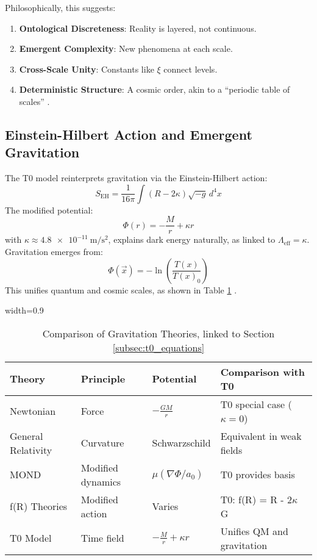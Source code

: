 \documentclass[12pt,a4paper]{article}
\newcommand{\Tfield}{T(x)}
\newcommand{\tablescale}{0.9}
\begin{document}
	Philosophically, this suggests:
	\begin{enumerate}
		\item \textbf{Ontological Discreteness}: Reality is layered, not continuous.
		\item \textbf{Emergent Complexity}: New phenomena at each scale.
		\item \textbf{Cross-Scale Unity}: Constants like \(\xi\) connect levels.
		\item \textbf{Deterministic Structure}: A cosmic order, akin to a “periodic table of scales” \cite{pascher_perspective_2025}.
	\end{enumerate}
	
	\subsection{Einstein-Hilbert Action and Emergent Gravitation}
	\label{sec:gravitation}
	
	The T0 model reinterprets gravitation via the Einstein-Hilbert action:
	\[
	S_{\text{EH}} = \frac{1}{16 \pi} \int (R - 2 \kappa) \sqrt{-g} \, d^4x
	\]
	The modified potential:
	\[
	\Phi(r) = -\frac{M}{r} + \kappa r
	\]
	with \(\kappa \approx \SI{4.8e-11}{\meter\per\second\squared}\), explains dark energy naturally, as linked to \(\Lambda_{\text{eff}} = \kappa\). Gravitation emerges from:
	\[
	\Phi(\vec{x}) = -\ln\left(\frac{\Tfield}{\Tfield_0}\right)
	\]
	This unifies quantum and cosmic scales, as shown in Table \ref{tab:theory_comparison} \cite{pascher_emergente_2025}.
	
	\begin{table}[htbp]
		\centering
		\begin{adjustbox}{width=\tablescale\textwidth}
			\begin{tabular}{p{3cm}p{3cm}p{4cm}p{4cm}}
				\toprule
				\textbf{Theory} & \textbf{Principle} & \textbf{Potential} & \textbf{Comparison with T0} \\
				\midrule
				Newtonian & Force & \(-\frac{G M}{r}\) & T0 special case (\(\kappa = 0\)) \\
				General Relativity & Curvature & Schwarzschild & Equivalent in weak fields \\
				MOND & Modified dynamics & \(\mu(\nabla \Phi/a_0)\) & T0 provides basis \\
				f(R) Theories & Modified action & Varies & T0: f(R) = R - 2\(\kappa\) G \\
				T0 Model & Time field & \(-\frac{M}{r} + \kappa r\) & Unifies QM and gravitation \\
				\bottomrule
			\end{tabular}
		\end{adjustbox}
		\caption{Comparison of Gravitation Theories, linked to Section \ref{subsec:t0_equations}}
		\label{tab:theory_comparison}
	\end{table}
	
\end{document}
